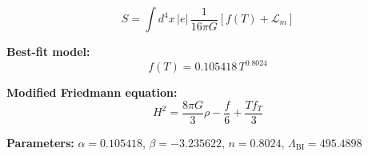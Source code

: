 
\begin{equation}
  S = \int d^4x \, |e| \, \frac{1}{16\pi G} \left[ f(T) + \mathcal{L}_m \right]
\end{equation}

\textbf{Best-fit model:}
\begin{equation}
  f(T) = 0.105418 \, T^{0.8024}
\end{equation}

\textbf{Modified Friedmann equation:}
\begin{equation}
  H^2 = \frac{8\pi G}{3} \rho - \frac{f}{6} + \frac{T f_T}{3}
\end{equation}

\textbf{Parameters:}
$\alpha = 0.105418$, \quad
$\beta = -3.235622$, \quad
$n = 0.8024$, \quad
$\Lambda_{\text{BI}} = 495.4898$